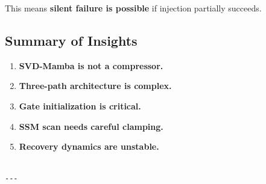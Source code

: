 This means \textbf{silent failure is possible} if injection partially succeeds.

\subsection{Summary of Insights}

\begin{enumerate}
\item \textbf{SVD-Mamba is not a compressor.}
\item \textbf{Three-path architecture is complex.}
\item \textbf{Gate initialization is critical.}
\item \textbf{SSM scan needs careful clamping.}
\item \textbf{Recovery dynamics are unstable.}
\end{enumerate}
\begin{lstlisting}

---
\end{lstlisting}